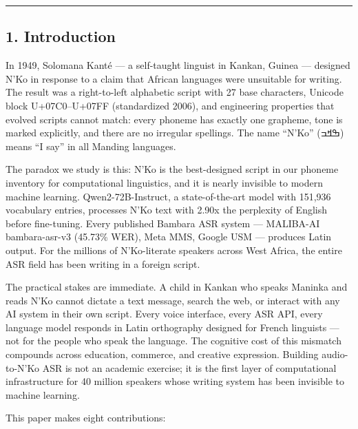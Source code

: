 \documentclass[
]{article}
\begin{document}
\begin{center}\rule{0.5\linewidth}{0.5pt}\end{center}

\subsection{1. Introduction}\label{introduction}

In 1949, Solomana Kanté --- a self-taught linguist in Kankan, Guinea ---
designed N'Ko in response to a claim that African languages were
unsuitable for writing. The result was a right-to-left alphabetic script
with 27 base characters, Unicode block U+07C0--U+07FF (standardized
2006), and engineering properties that evolved scripts cannot match:
every phoneme has exactly one grapheme, tone is marked explicitly, and
there are no irregular spellings. The name ``N'Ko'' (ߒߞߏ) means ``I
say'' in all Manding languages.

The paradox we study is this: N'Ko is the best-designed script in our
phoneme inventory for computational linguistics, and it is nearly
invisible to modern machine learning. Qwen2-72B-Instruct, a
state-of-the-art model with 151,936 vocabulary entries, processes N'Ko
text with 2.90x the perplexity of English before fine-tuning. Every
published Bambara ASR system --- MALIBA-AI bambara-asr-v3 (45.73\% WER),
Meta MMS, Google USM --- produces Latin output. For the millions of
N'Ko-literate speakers across West Africa, the entire ASR field has been
writing in a foreign script.

The practical stakes are immediate. A child in Kankan who speaks Maninka
and reads N'Ko cannot dictate a text message, search the web, or
interact with any AI system in their own script. Every voice interface,
every ASR API, every language model responds in Latin orthography
designed for French linguists --- not for the people who speak the
language. The cognitive cost of this mismatch compounds across
education, commerce, and creative expression. Building audio-to-N'Ko ASR
is not an academic exercise; it is the first layer of computational
infrastructure for 40 million speakers whose writing system has been
invisible to machine learning.

This paper makes eight contributions:
\end{document}
